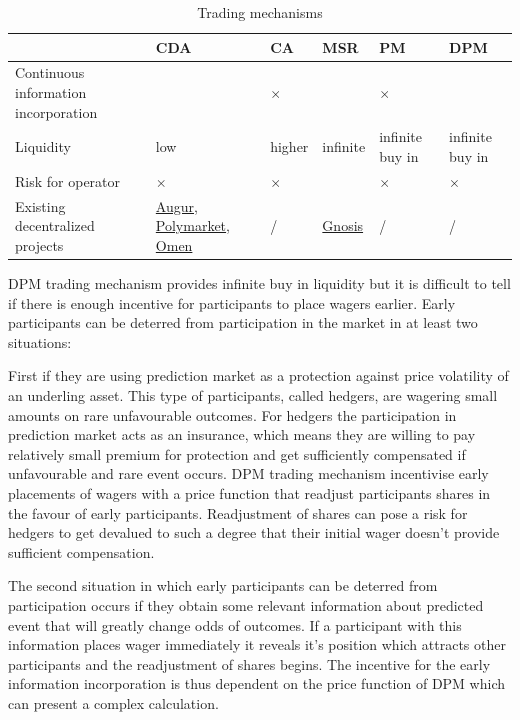 \documentclass{article}
\begin{document}
	\begin{table}[h]
		\centering	
		\caption{Trading mechanisms}
		\label{tab:tradingMechanisms}
		\begin{tabularx}{\textwidth}{|m{4cm}|m{3cm}|m{1cm}|m{1cm}|m{2cm}|m{2.9cm}|}
			\hline
			& \textbf{CDA} & \textbf{CA} & \textbf{MSR} & \textbf{PM} & \textbf{DPM} \\ \hline
			Continuous information incorporation & \checkmark & $\times$ & \checkmark & $\times$ & \checkmark \\ \hline
			Liquidity & low & higher & infinite & infinite buy in & infinite buy in\\ \hline
			Risk for operator & $\times$ & $\times$ & \checkmark & $\times$ & $\times$ \\ \hline
			Existing decentralized projects & 
			\href{https://augur.net/}{Augur}, 
			\href{https://polymarket.com}{Polymarket}, 
			\href{https://omen.eth.link}{Omen} 
			& / & \href{https://https://gnosis.io}{Gnosis} & / & / \\ \hline
		\end{tabularx}
	\end{table}	
	
	DPM trading mechanism provides infinite buy in liquidity but it is difficult to tell if there is enough incentive for participants to place wagers earlier. Early participants can be deterred from participation in the market in at least two situations: 
	
	First if they are using prediction market as a protection against price volatility of an underling asset. This type of participants, called hedgers, are wagering small amounts on rare unfavourable outcomes. For hedgers the participation in prediction market acts as an insurance, which means they are willing to pay relatively small premium for protection and get sufficiently compensated if unfavourable and rare event occurs. DPM trading mechanism incentivise early placements of wagers with a price function that readjust participants shares in the favour of early participants. Readjustment of shares can pose a risk for hedgers to get devalued to such a degree that their initial wager doesn't provide sufficient compensation. 
	
	The second situation in which early participants can be deterred from participation occurs if they obtain some relevant information about predicted event that will greatly change odds of outcomes. If a participant with this information places wager immediately it reveals it's position which attracts other participants and the readjustment of shares begins. The incentive for the early information incorporation is thus dependent on the price function of DPM which can present a complex calculation.
	
\end{document}
